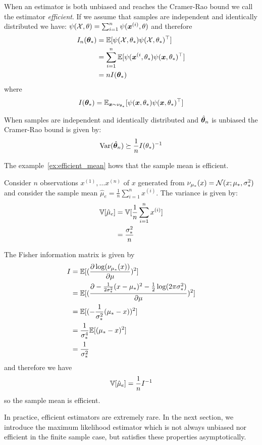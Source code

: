 When an estimator is both unbiased and reaches the Cramer-Rao bound we call the
estimator \emph{efficient}.
If we assume that samples are independent and identically distributed we
have: $\psi(\mathcal{X}, \theta) = \sum_{i=1}^n \psi(\boldsymbol{x}^{(i)}, \theta)$ and therefore
\begin{align}
  I_n(\boldsymbol{\theta}_*) &= \mathbb{E}[\psi(\mathcal{X}, \theta_*) \psi(\mathcal{X}, \theta_*)^{\top}] \\
               &= \sum_{i=1}^n \mathbb{E}[\psi(\boldsymbol{x}^{(i}, \theta_*) \psi(\boldsymbol{x}, \theta_*)^{\top}] \\
               &= n I(\boldsymbol{\theta}_*)
\end{align}
where
\begin{align}
  I(\boldsymbol{\theta}_*) = \mathbb{E}_{\boldsymbol{x} \sim \nu_{\theta_*}} [\psi(\boldsymbol{x}, \theta_*) \psi(\boldsymbol{x}, \theta_*)^{\top}]
\end{align}

When samples are independent and identically distributed and $\hat{\boldsymbol{\theta}}_n$ is unbiased the Cramer-Rao
bound is given by:
\begin{equation}
  \operatorname*{Var}(\hat{\boldsymbol{\theta}}_n) \succeq \frac1{n} I(\theta_*)^{-1}
\end{equation}

The example~\ref{ex:efficient_mean} hows that the sample mean
is efficient.
\begin{example}
  \label{ex:efficient_mean}
  Consider $n$ observations $x^{(1)},
  \dots x^{(n)}$ of $x$ generated from $\nu_{\mu_*}(x) = \mathcal{N}(x; \mu_*, \sigma_*^2)$
  and consider the sample mean $\hat{\mu}_e = \frac1{n} \sum_{i=1}^n x^{(i)}$.
  The variance is given by:
  \begin{align}
    \mathbb{V}[\hat{\mu}_e] &= \mathbb{V}[\frac1{n} \sum_{i=1}^n x^{(i)}] \\
    &= \frac{\sigma_*^2}{n}
  \end{align}

  The Fisher information matrix is given by
  \begin{align}
    I &= \mathbb{E}[(\frac{ \partial \log(\nu_{\mu_*}(x))}{\partial \mu})^2] \\
      &= \mathbb{E}[(\frac{ \partial -\frac1{2 \sigma_*^2} (x - \mu_*)^2 - \frac12\log(2\pi \sigma_*^2)}{\partial \mu})^2] \\
      &= \mathbb{E}[(-\frac1{\sigma_*^2} (\mu_* - x))^2] \\
      &= \frac1{\sigma_*^4}\mathbb{E} [(\mu_* - x)^2] \\
      &= \frac1{\sigma_*^2}
  \end{align}
  and therefore we have
  \begin{equation}
  \mathbb{V}[\hat{\mu}_e]  = \frac1{n} I^{-1}
  \end{equation}
  so the sample mean is efficient.
\end{example}
In practice, efficient estimators are extremely rare. In the next section, we
introduce the maximum likelihood estimator which is not always unbiased nor
efficient in the finite sample case, but satisfies these properties asymptotically.

